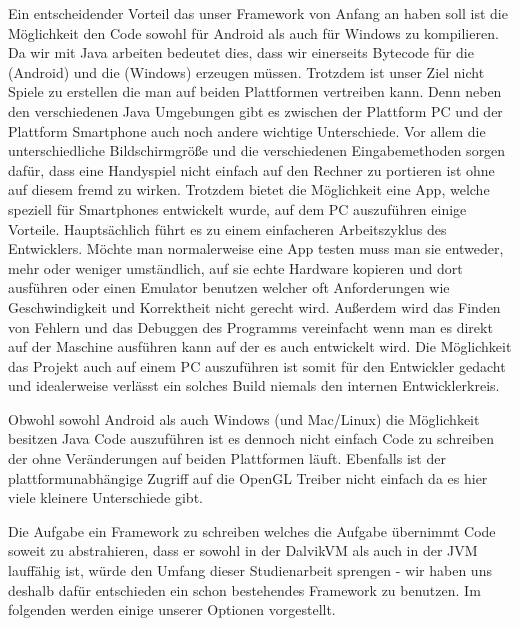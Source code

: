 Ein entscheidender Vorteil das unser Framework von Anfang an haben soll ist die Möglichkeit den Code sowohl für Android als auch für Windows zu kompilieren.
Da wir mit Java arbeiten bedeutet dies, dass wir einerseits Bytecode für die  (Android) und die  (Windows) erzeugen müssen.
Trotzdem ist unser Ziel nicht Spiele zu erstellen die man auf beiden Plattformen vertreiben kann.
Denn neben den verschiedenen Java Umgebungen gibt es zwischen der Plattform PC und der Plattform Smartphone auch noch andere wichtige Unterschiede.
Vor allem die unterschiedliche Bildschirmgröße und die verschiedenen Eingabemethoden sorgen dafür, dass eine Handyspiel nicht einfach auf den Rechner zu portieren ist ohne auf diesem fremd zu wirken.
Trotzdem bietet die Möglichkeit eine App, welche speziell für Smartphones entwickelt wurde, auf dem PC auszuführen einige Vorteile.
Hauptsächlich führt es zu einem einfacheren Arbeitszyklus des Entwicklers. Möchte man normalerweise eine App testen muss man sie entweder, mehr oder weniger umständlich, auf sie echte Hardware kopieren und dort ausführen oder einen Emulator benutzen welcher oft Anforderungen wie Geschwindigkeit und Korrektheit nicht gerecht wird. Außerdem wird das Finden von Fehlern und das Debuggen des Programms vereinfacht wenn man es direkt auf der Maschine ausführen kann auf der es auch entwickelt wird.
Die Möglichkeit das Projekt auch auf einem PC auszuführen ist somit für den Entwickler gedacht und idealerweise verlässt ein solches Build niemals den internen Entwicklerkreis.


Obwohl sowohl Android als auch Windows (und Mac/Linux) die Möglichkeit besitzen Java Code auszuführen ist es dennoch nicht einfach Code zu schreiben der ohne Veränderungen auf beiden Plattformen läuft. Ebenfalls ist der plattformunabhängige Zugriff auf die OpenGL Treiber nicht einfach da es hier viele kleinere Unterschiede gibt.

Die Aufgabe ein Framework zu schreiben welches die Aufgabe übernimmt Code soweit zu abstrahieren, dass er sowohl in der DalvikVM als auch in der JVM lauffähig ist, würde den Umfang dieser Studienarbeit sprengen - wir haben uns deshalb dafür entschieden ein schon bestehendes Framework zu benutzen. Im folgenden werden einige unserer Optionen vorgestellt.